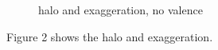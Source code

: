 \documentclass{article} %
\begin{document}

\begin{figure}[t]
\caption{halo and exaggeration, no valence}
\end{figure}

Figure 2 shows the halo and exaggeration.


\end{document}
